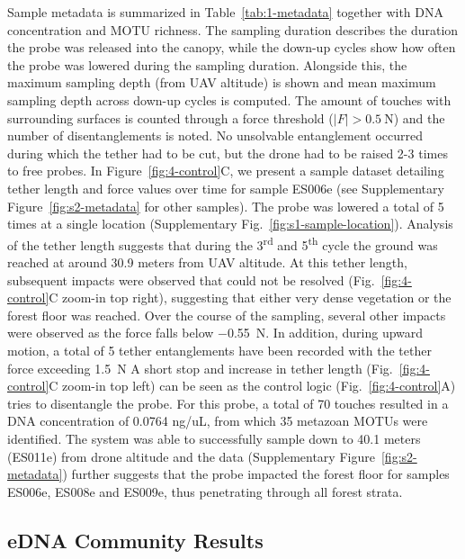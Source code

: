 Sample metadata is summarized in Table~\ref{tab:1-metadata} together with DNA concentration and \gls{MOTU} richness. The sampling duration describes the duration the probe was released into the canopy, while the down-up cycles show how often the probe was lowered during the sampling duration. Alongside this, the maximum sampling depth (from UAV altitude) is shown and mean maximum sampling depth across down-up cycles is computed. The amount of touches with surrounding surfaces is counted through a force threshold ($\vert F \vert > \SI{0.5}{\newton}$) and the number of disentanglements is noted. No unsolvable entanglement occurred during which the tether had to be cut, but the drone had to be raised 2-3 times to free probes.
In Figure~\ref{fig:4-control}C, we present a sample dataset detailing tether length and force values over time for sample ES006e (see Supplementary Figure~\ref{fig:s2-metadata} for other samples). The probe was lowered a total of 5 times at a single location (Supplementary Fig.~\ref{fig:s1-sample-location}). Analysis of the tether length suggests that during the 3\textsuperscript{rd} and 5\textsuperscript{th} cycle the ground was reached at around 30.9 meters from UAV altitude. At this tether length, subsequent impacts were observed that could not be resolved (Fig.~\ref{fig:4-control}C zoom-in top right), suggesting that either very dense vegetation or the forest floor was reached. Over the course of the sampling, several other impacts were observed as the force falls below \SI{-0.55}{\newton}. In addition, during upward motion, a total of 5 tether entanglements have been recorded with the tether force exceeding \SI{1.5}{\newton} A short stop and increase in tether length (Fig.~\ref{fig:4-control}C zoom-in top left) can be seen as the control logic (Fig.~\ref{fig:4-control}A) tries to disentangle the probe. For this probe, a total of 70 touches resulted in a DNA concentration of 0.0764 ng/uL, from which 35 metazoan \glspl{MOTU} were identified.
The system was able to successfully sample down to 40.1 meters (ES011e) from drone altitude and the data (Supplementary Figure~\ref{fig:s2-metadata}) further suggests that the probe impacted the forest floor for samples ES006e, ES008e and ES009e, thus penetrating through all forest strata.

\subsection{eDNA Community Results}
\label{sec:field-edna}

